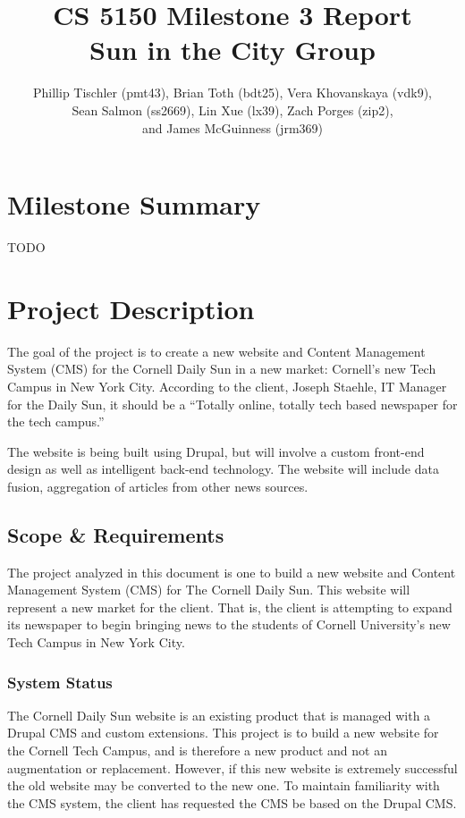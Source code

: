 \documentclass[12pt]{article} %
\title{CS 5150 Milestone 3 Report \\ Sun in the City Group}
\author{Phillip Tischler (pmt43), Brian Toth (bdt25), Vera Khovanskaya (vdk9), \\ 
Sean Salmon (ss2669), Lin Xue (lx39), Zach Porges (zip2),  \\
and James McGuinness (jrm369)}
\begin{document}
\maketitle
\tableofcontents
\clearpage

\section{Milestone Summary}

TODO

\section{Project Description}

The goal of the project is to create a new website and Content Management System (CMS) for the Cornell Daily Sun in a new market: Cornell’s new Tech Campus in New York City. According to the client, Joseph Staehle, IT Manager for the Daily Sun, it should be a ``Totally online, totally tech based newspaper for the tech campus.”

The website is being built using Drupal, but will involve a custom front-end design as well as intelligent back-end technology. The website will include data fusion, aggregation of articles from other news sources.

\subsection{Scope \& Requirements}

The project analyzed in this document is one to build a new website and Content Management System (CMS) for The Cornell Daily Sun. This website will represent a new market for the client. That is, the client is attempting to expand its newspaper to begin bringing news to the students of Cornell University’s new Tech Campus in New York City.
                   
\subsubsection{System Status}
                   
The Cornell Daily Sun website is an existing product that is managed with a Drupal CMS and custom extensions. This project is to build a new website for the Cornell Tech Campus, and is therefore a new product and not an augmentation or replacement. However, if this new website is extremely successful the old website may be converted to the new one. To maintain familiarity with the CMS system, the client has requested the CMS be based on the Drupal CMS.
                   
\end{document}
